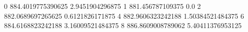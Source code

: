 0 884.4019775390625 2.9451904296875
1 881.456787109375 0.0
2 882.0689697265625 0.6121826171875
4 882.9606323242188 1.50384521484375
6 884.6168823242188 3.16009521484375
8 886.8609008789062 5.40411376953125
